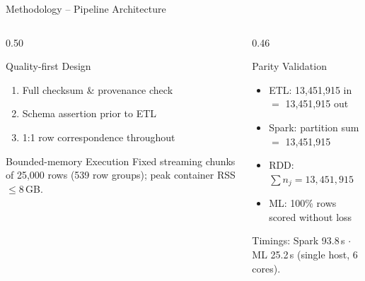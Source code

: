 \documentclass[aspectratio=169]{beamer}
\begin{document}
\begin{frame}{Methodology -- Pipeline Architecture}
  \begin{columns}[T]
    \begin{column}{0.50\textwidth}
      \begin{block}{Quality-first Design}
        \footnotesize
        \begin{enumerate}
          \item Full checksum \& provenance check
          \item Schema assertion prior to ETL
          \item 1:1 row correspondence throughout
        \end{enumerate}
      \end{block}
      \begin{block}{Bounded-memory Execution}
        \footnotesize
        Fixed streaming chunks of 25{,}000 rows (539 row groups); peak container RSS $\le 8$\,GB.
      \end{block}
    \end{column}
    \begin{column}{0.46\textwidth}
      \begin{exampleblock}{Parity Validation}
        \footnotesize
        \begin{itemize}
          \item ETL: 13{,}451{,}915 in $=$ 13{,}451{,}915 out
          \item Spark: partition sum $=$ 13{,}451{,}915
          \item RDD: $\sum n_j = 13{,}451{,}915$
          \item ML: 100\% rows scored without loss
        \end{itemize}
      \end{exampleblock}
      \vspace{0.1cm}
      \scriptsize Timings: Spark 93.8\,s $\cdot$ ML 25.2\,s (single host, 6 cores).
    \end{column}
  \end{columns}
\end{frame}

\end{document}
